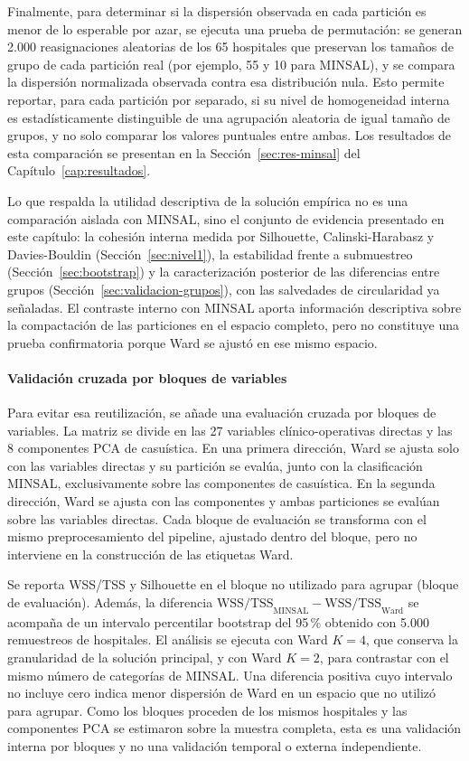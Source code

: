 Finalmente, para determinar si la dispersión observada en cada partición es
menor de lo esperable por azar, se ejecuta una prueba de permutación: se
generan 2.000 reasignaciones aleatorias de los 65 hospitales que preservan
los tamaños de grupo de cada partición real (por ejemplo, 55 y 10 para
MINSAL), y se compara la dispersión normalizada observada contra esa
distribución nula. Esto permite reportar, para cada partición por separado,
si su nivel de homogeneidad interna es estadísticamente distinguible de una
agrupación aleatoria de igual tamaño de grupos, y no solo comparar los
valores puntuales entre ambas. Los resultados de esta comparación se
presentan en la Sección~\ref{sec:res-minsal} del Capítulo~\ref{cap:resultados}.

Lo que respalda la utilidad descriptiva de la solución empírica no es una
comparación aislada con MINSAL, sino el conjunto de evidencia presentado en
este capítulo: la cohesión interna medida por Silhouette, Calinski-Harabasz y
Davies-Bouldin (Sección~\ref{sec:nivel1}), la estabilidad frente a
submuestreo (Sección~\ref{sec:bootstrap}) y la caracterización posterior de
las diferencias entre grupos (Sección~\ref{sec:validacion-grupos}), con las
salvedades de circularidad ya señaladas. El contraste interno con MINSAL aporta
información descriptiva sobre la compactación de las particiones en el espacio
completo, pero no constituye una prueba confirmatoria porque Ward se ajustó en
ese mismo espacio.

\paragraph{Validación cruzada por bloques de variables}
\label{sec:comparacion-homogeneidad-cruzada}

Para evitar esa reutilización, se añade una evaluación cruzada por bloques de
variables. La matriz se divide en las 27 variables clínico-operativas directas y
las 8 componentes PCA de casuística. En una primera dirección, Ward se ajusta
solo con las variables directas y su partición se evalúa, junto con la
clasificación MINSAL, exclusivamente sobre las componentes de casuística. En la
segunda dirección, Ward se ajusta con las componentes y ambas particiones se
evalúan sobre las variables directas. Cada bloque de evaluación se transforma
con el mismo preprocesamiento del pipeline, ajustado dentro del bloque, pero no
interviene en la construcción de las etiquetas Ward.

Se reporta WSS/TSS y Silhouette en el bloque no utilizado para agrupar (bloque de evaluación). Además, la diferencia
$\mathrm{WSS/TSS}_{\mathrm{MINSAL}}-\mathrm{WSS/TSS}_{\mathrm{Ward}}$ se
acompaña de un intervalo percentilar bootstrap del 95\,\% obtenido con 5.000
remuestreos de hospitales. El análisis se ejecuta con Ward $K=4$, que conserva
la granularidad de la solución principal, y con Ward $K=2$, para contrastar con
el mismo número de categorías de MINSAL. Una diferencia positiva cuyo intervalo
no incluye cero indica menor dispersión de Ward en un espacio que no utilizó
para agrupar. Como los bloques proceden de los mismos hospitales y las
componentes PCA se estimaron sobre la muestra completa, esta es una validación
interna por bloques y no una validación temporal o externa independiente.


